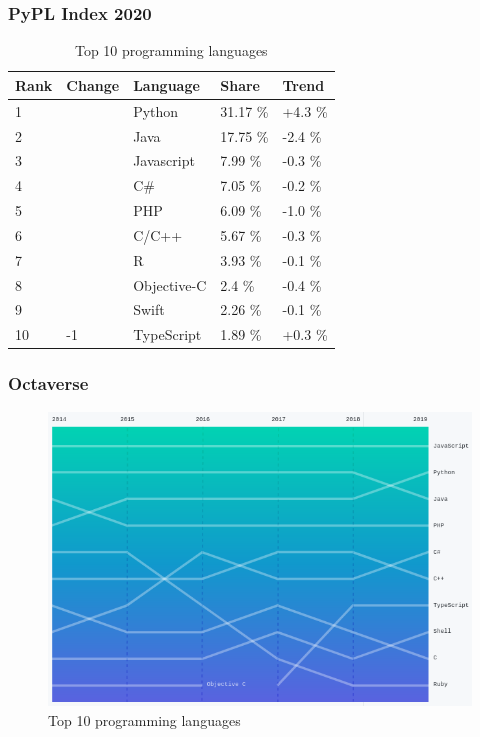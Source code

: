 \documentclass[10pt, compress]{beamer}
\begin{document}
\begin{frame}[fragile]
    \frametitle{PyPL Index 2020}
    
    \begin{table}
        \centering
        \begin{tabular}{ll|l|ll}
            Rank & Change & Language & Share & Trend \\ \hline
            1 &  & Python & 31.17 \% & +4.3 \% \\ 
            2 &  & Java & 17.75 \% & -2.4 \% \\ 
            3 &  & Javascript & 7.99 \% & -0.3 \% \\ 
            4 &  & C\# & 7.05 \% & -0.2 \% \\ 
            5 &  & PHP & 6.09 \% & -1.0 \% \\ 
            6 &  & C/C++ & 5.67 \% & -0.3 \% \\ 
            7 &  & R & 3.93 \% & -0.1 \% \\ 
            8 &  & Objective-C & 2.4 \% & -0.4 \% \\ 
            9 &  & Swift & 2.26 \% & -0.1 \% \\ 
            10 & -1 & TypeScript & 1.89 \% & +0.3 \% \\
        \end{tabular}
        \caption{Top 10 programming languages}
        \label{tab:pypl-top-10}
\end{table}
\end{frame}

\begin{frame}[fragile]
    \frametitle{Octaverse}
    
    \begin{figure}
        \centering
        \includegraphics[scale=0.4]{images/octaverse.png}
        \caption{Top 10 programming languages}
        \label{fig:octaverse-top-10}
    \end{figure}
\end{frame}

\end{document}
